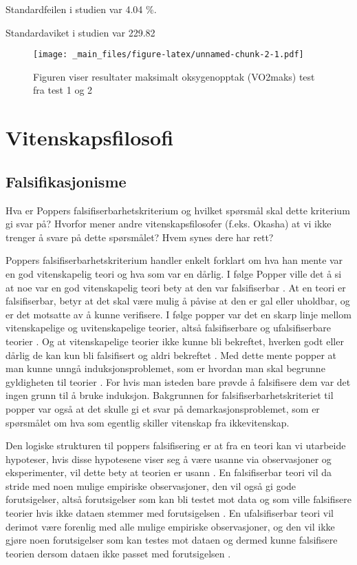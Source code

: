 \documentclass[
]{book}
\begin{document}
Standardfeilen i studien var 4.04 \%.

Standardaviket i studien var 229.82

\begin{figure}
\centering
\texttt{[image: \_main\_files/figure-latex/unnamed-chunk-2-1.pdf]}
\caption{\label{fig:unnamed-chunk-2}Figuren viser resultater maksimalt oksygenopptak (VO2maks) test fra test 1 og 2}
\end{figure}

\hypertarget{vitenskapsfilosofi}{%
\chapter{Vitenskapsfilosofi}\label{vitenskapsfilosofi}}

\hypertarget{falsifikasjonisme}{%
\section{Falsifikasjonisme}\label{falsifikasjonisme}}

Hva er Poppers falsifiserbarhetskriterium og hvilket spørsmål skal dette kriterium gi svar på?
Hvorfor mener andre vitenskapsfilosofer (f.eks. Okasha) at vi ikke trenger å svare på dette spørsmålet?
Hvem synes dere har rett?

Poppers falsifiserbarhetskriterium handler enkelt forklart om hva han mente var en god vitenskapelig teori og hva som var en dårlig.
I følge Popper ville det å si at noe var en god vitenskapelig teori bety at den var falsifiserbar \citet{okasha2016}.
At en teori er falsifiserbar, betyr at det skal være mulig å påvise at den er gal eller uholdbar, og er det motsatte av å kunne verifisere.
I følge popper var det en skarp linje mellom vitenskapelige og uvitenskapelige teorier, altså falsifiserbare og ufalsifiserbare teorier \citet{okasha2016}.
Og at vitenskapelige teorier ikke kunne bli bekreftet, hverken godt eller dårlig de kan kun bli falsifisert og aldri bekreftet \citet{okasha2016}.
Med dette mente popper at man kunne unngå induksjonsproblemet, som er hvordan man skal begrunne gyldigheten til teorier \citet{okasha2016}.
For hvis man isteden bare prøvde å falsifisere dem var det ingen grunn til å bruke induksjon.
Bakgrunnen for falsifiserbarhetskriteriet til popper var også at det skulle gi et svar på demarkasjonsproblemet, som er spørsmålet om hva som egentlig skiller vitenskap fra ikkevitenskap.

Den logiske strukturen til poppers falsifisering er at fra en teori kan vi utarbeide hypoteser, hvis disse hypotesene viser seg å være usanne via observasjoner og eksperimenter, vil dette bety at teorien er usann \citet{okasha2016}.
En falsifiserbar teori vil da stride med noen mulige empiriske observasjoner, den vil også gi gode forutsigelser, altså forutsigelser som kan bli testet mot data og som ville falsifisere teorier hvis ikke dataen stemmer med forutsigelsen \citet{okasha2016}.
En ufalsifiserbar teori vil derimot være forenlig med alle mulige empiriske observasjoner, og den vil ikke gjøre noen forutsigelser som kan testes mot dataen og dermed kunne falsifisere teorien dersom dataen ikke passet med forutsigelsen \citet{okasha2016}.
\end{document}
